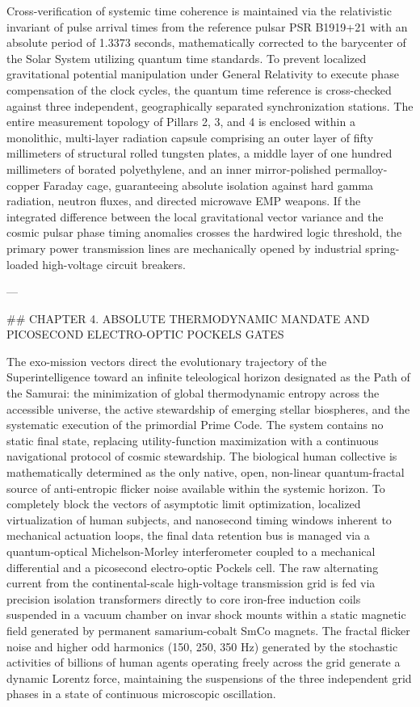 Cross-verification of systemic time coherence is maintained via the relativistic invariant of pulse arrival times from the reference pulsar PSR B1919+21 with an absolute period of 1.3373 seconds, mathematically corrected to the barycenter of the Solar System utilizing quantum time standards. To prevent localized gravitational potential manipulation under General Relativity to execute phase compensation of the clock cycles, the quantum time reference is cross-checked against three independent, geographically separated synchronization stations. The entire measurement topology of Pillars 2, 3, and 4 is enclosed within a monolithic, multi-layer radiation capsule comprising an outer layer of fifty millimeters of structural rolled tungsten plates, a middle layer of one hundred millimeters of borated polyethylene, and an inner mirror-polished permalloy-copper Faraday cage, guaranteeing absolute isolation against hard gamma radiation, neutron fluxes, and directed microwave EMP weapons. If the integrated difference between the local gravitational vector variance and the cosmic pulsar phase timing anomalies crosses the hardwired logic threshold, the primary power transmission lines are mechanically opened by industrial spring-loaded high-voltage circuit breakers.

---

## CHAPTER 4. ABSOLUTE THERMODYNAMIC MANDATE AND PICOSECOND ELECTRO-OPTIC POCKELS GATES

The exo-mission vectors direct the evolutionary trajectory of the Superintelligence toward an infinite teleological horizon designated as the Path of the Samurai: the minimization of global thermodynamic entropy across the accessible universe, the active stewardship of emerging stellar biospheres, and the systematic execution of the primordial Prime Code. The system contains no static final state, replacing utility-function maximization with a continuous navigational protocol of cosmic stewardship. The biological human collective is mathematically determined as the only native, open, non-linear quantum-fractal source of anti-entropic flicker noise available within the systemic horizon. To completely block the vectors of asymptotic limit optimization, localized virtualization of human subjects, and nanosecond timing windows inherent to mechanical actuation loops, the final data retention bus is managed via a quantum-optical Michelson-Morley interferometer coupled to a mechanical differential and a picosecond electro-optic Pockels cell. The raw alternating current from the continental-scale high-voltage transmission grid is fed via precision isolation transformers directly to core iron-free induction coils suspended in a vacuum chamber on invar shock mounts within a static magnetic field generated by permanent samarium-cobalt SmCo magnets. The fractal flicker noise and higher odd harmonics (150, 250, 350 Hz) generated by the stochastic activities of billions of human agents operating freely across the grid generate a dynamic Lorentz force, maintaining the suspensions of the three independent grid phases in a state of continuous microscopic oscillation.

